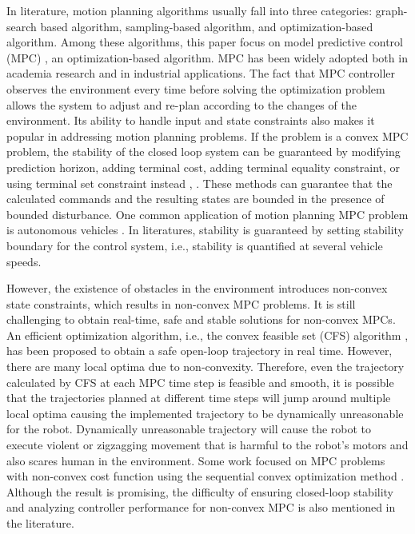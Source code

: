 \documentclass[letterpaper, 10 pt, conference]{ieeeconf}  %
\begin{document}
In literature, motion planning algorithms usually fall into three categories: graph-search based algorithm, sampling-based algorithm, and optimization-based algorithm. Among these algorithms, this paper focus on model predictive control (MPC) \cite{rawlings1999tutorial}, an optimization-based algorithm. MPC has been widely adopted both in academia research and in industrial applications. The fact that MPC controller observes the environment every time before solving the optimization problem allows the system to adjust and re-plan according to the changes of the environment. Its ability to handle input and state constraints also makes it popular in addressing motion planning problems. If the problem is a convex MPC problem, the stability of the closed loop system can be guaranteed by modifying prediction horizon, adding terminal cost, adding terminal equality constraint, or using terminal set constraint instead \cite{mayne2000constrained}, \cite{limon2006stability}. These methods can guarantee that the calculated commands and the resulting states are bounded in the presence of bounded disturbance. One common application of motion planning MPC problem is autonomous vehicles \cite{borrelli2005mpc}. In literatures, stability is guaranteed by setting stability boundary for the control system, i.e., stability is quantified at several vehicle speeds.

However, the existence of obstacles in the environment introduces non-convex state constraints, which results in non-convex MPC problems. It is still challenging to obtain real-time, safe and stable solutions for non-convex MPCs. An efficient optimization algorithm, i.e., the convex feasible set (CFS) algorithm \cite{liu2018convex}, has been proposed to obtain a safe open-loop trajectory in real time. However, there are many local optima due to non-convexity. Therefore, even the trajectory calculated by CFS at each MPC time step is feasible and smooth, it is possible that the trajectories planned at different time steps will jump around multiple local optima causing the implemented trajectory to be dynamically unreasonable for the robot. Dynamically unreasonable trajectory will cause the robot to execute violent or zigzagging movement that is harmful to the robot's motors and also scares human in the environment. Some work focused on MPC problems with non-convex cost function using the sequential convex optimization method \cite{hovgaard2013nonconvex}. Although the result is promising, the difficulty of ensuring closed-loop stability and analyzing controller performance for non-convex MPC is also mentioned in the literature. 
\end{document}
